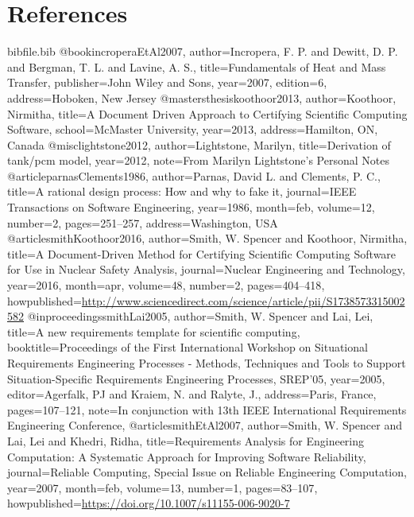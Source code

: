 \documentclass[12pt]{article}
\begin{document}
\section{References}
\label{Sec:References}
\begin{filecontents*}{bibfile.bib}
@book{incroperaEtAl2007,
author={Incropera, F. P. and Dewitt, D. P. and Bergman, T. L. and Lavine, A. S.},
title={Fundamentals of Heat and Mass Transfer},
publisher={John Wiley and Sons},
year={2007},
edition={6},
address={Hoboken, New Jersey}}
@mastersthesis{koothoor2013,
author={Koothoor, Nirmitha},
title={A Document Driven Approach to Certifying Scientific Computing Software},
school={McMaster University},
year={2013},
address={Hamilton, ON, Canada}}
@misc{lightstone2012,
author={Lightstone, Marilyn},
title={Derivation of tank/pcm model},
year={2012},
note={From Marilyn Lightstone's Personal Notes}}
@article{parnasClements1986,
author={Parnas, David L. and Clements, P. C.},
title={A rational design process: How and why to fake it},
journal={IEEE Transactions on Software Engineering},
year={1986},
month=feb,
volume={12},
number={2},
pages={251--257},
address={Washington, USA}}
@article{smithKoothoor2016,
author={Smith, W. Spencer and Koothoor, Nirmitha},
title={A Document-Driven Method for Certifying Scientific Computing Software for Use in Nuclear Safety Analysis},
journal={Nuclear Engineering and Technology},
year={2016},
month=apr,
volume={48},
number={2},
pages={404--418},
howpublished={\url{http://www.sciencedirect.com/science/article/pii/S1738573315002582}}}
@inproceedings{smithLai2005,
author={Smith, W. Spencer and Lai, Lei},
title={A new requirements template for scientific computing},
booktitle={Proceedings of the First International Workshop on Situational Requirements Engineering Processes - Methods, Techniques and Tools to Support Situation-Specific Requirements Engineering Processes, SREP'05},
year={2005},
editor={Agerfalk, PJ and Kraiem, N. and Ralyte, J.},
address={Paris, France},
pages={107--121},
note={In conjunction with 13th IEEE International Requirements Engineering Conference,}}
@article{smithEtAl2007,
author={Smith, W. Spencer and Lai, Lei and Khedri, Ridha},
title={Requirements Analysis for Engineering Computation: A Systematic Approach for Improving Software Reliability},
journal={Reliable Computing, Special Issue on Reliable Engineering Computation},
year={2007},
month=feb,
volume={13},
number={1},
pages={83--107},
howpublished={\url{https://doi.org/10.1007/s11155-006-9020-7}}}
\end{filecontents*}
\nocite{*}
\printbibliography[heading=none]
\end{document}
